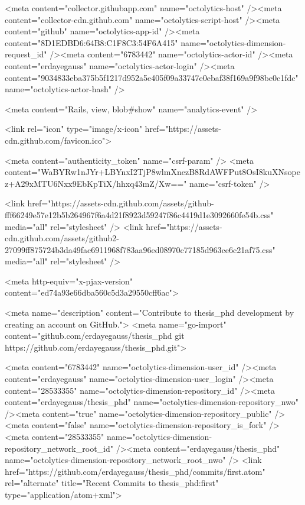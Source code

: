     <meta content="collector.githubapp.com" name="octolytics-host" /><meta content="collector-cdn.github.com" name="octolytics-script-host" /><meta content="github" name="octolytics-app-id" /><meta content="8D1EDBD6:64B8:C1F8C3:54F6A415" name="octolytics-dimension-request_id" /><meta content="6783442" name="octolytics-actor-id" /><meta content="erdayegauss" name="octolytics-actor-login" /><meta content="9034833eba375b5f1217d952a5e405f09a33747e0ebaf38f169a9f98be0c1fdc" name="octolytics-actor-hash" />
    
    <meta content="Rails, view, blob#show" name="analytics-event" />

    
    <link rel="icon" type="image/x-icon" href="https://assets-cdn.github.com/favicon.ico">


    <meta content="authenticity_token" name="csrf-param" />
<meta content="WaBYRw1nJYr+LBYnxI2TjP8wlmXnezB8RdAWFPut8OsI8kuXNsopez+A29xMTU6Nxx9EbKpTiX/hhxq43mZ/Xw==" name="csrf-token" />

    <link href="https://assets-cdn.github.com/assets/github-fff66249e57e12b5b264967f6a4d21f8923d59247f86c4419d1e3092660fe54b.css" media="all" rel="stylesheet" />
    <link href="https://assets-cdn.github.com/assets/github2-27099ff875724b3da49fac6911968f783aa96ed08970c77185d963ce6c21af75.css" media="all" rel="stylesheet" />
    
    


    <meta http-equiv="x-pjax-version" content="ed74a93e66dba560c5d3a29550cff6ac">

      
  <meta name="description" content="Contribute to thesis_phd development by creating an account on GitHub.">
  <meta name="go-import" content="github.com/erdayegauss/thesis_phd git https://github.com/erdayegauss/thesis_phd.git">

  <meta content="6783442" name="octolytics-dimension-user_id" /><meta content="erdayegauss" name="octolytics-dimension-user_login" /><meta content="28533355" name="octolytics-dimension-repository_id" /><meta content="erdayegauss/thesis_phd" name="octolytics-dimension-repository_nwo" /><meta content="true" name="octolytics-dimension-repository_public" /><meta content="false" name="octolytics-dimension-repository_is_fork" /><meta content="28533355" name="octolytics-dimension-repository_network_root_id" /><meta content="erdayegauss/thesis_phd" name="octolytics-dimension-repository_network_root_nwo" />
  <link href="https://github.com/erdayegauss/thesis_phd/commits/first.atom" rel="alternate" title="Recent Commits to thesis_phd:first" type="application/atom+xml">

